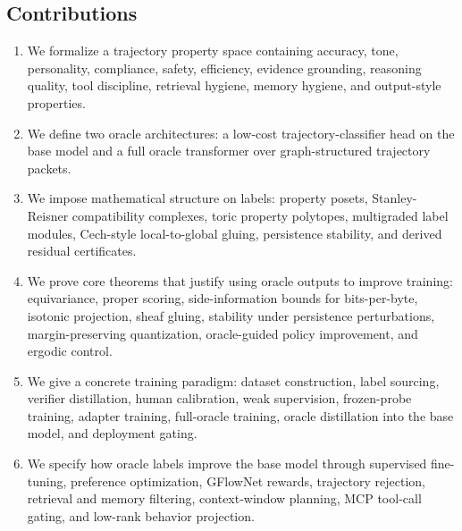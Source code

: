 \documentclass[11pt]{article}
\numberwithin{equation}{section}
\begin{document}
\subsection{Contributions}
\begin{enumerate}
\item We formalize a trajectory property space containing accuracy, tone, personality, compliance, safety, efficiency, evidence grounding, reasoning quality, tool discipline, retrieval hygiene, memory hygiene, and output-style properties.
\item We define two oracle architectures: a low-cost trajectory-classifier head on the base model and a full oracle transformer over graph-structured trajectory packets.
\item We impose mathematical structure on labels: property posets, Stanley-Reisner compatibility complexes, toric property polytopes, multigraded label modules, Cech-style local-to-global gluing, persistence stability, and derived residual certificates.
\item We prove core theorems that justify using oracle outputs to improve training: equivariance, proper scoring, side-information bounds for bits-per-byte, isotonic projection, sheaf gluing, stability under persistence perturbations, margin-preserving quantization, oracle-guided policy improvement, and ergodic control.
\item We give a concrete training paradigm: dataset construction, label sourcing, verifier distillation, human calibration, weak supervision, frozen-probe training, adapter training, full-oracle training, oracle distillation into the base model, and deployment gating.
\item We specify how oracle labels improve the base model through supervised fine-tuning, preference optimization, GFlowNet rewards, trajectory rejection, retrieval and memory filtering, context-window planning, MCP tool-call gating, and low-rank behavior projection.
\end{enumerate}
\end{document}
